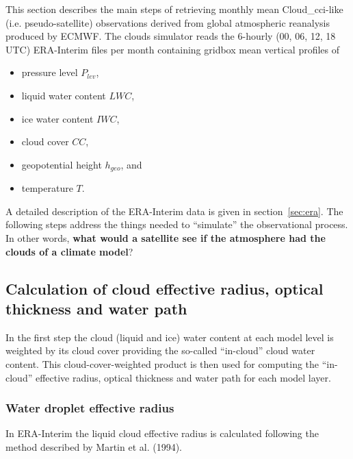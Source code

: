 

This section describes the main steps of retrieving monthly mean 
Cloud\_cci-like (i.e. pseudo-satellite) observations derived from 
global atmospheric reanalysis produced by ECMWF.
The clouds simulator reads the 6-hourly (00, 06, 12, 18 UTC) 
ERA-Interim files per month containing gridbox mean vertical profiles of
\begin{itemize}
    \item pressure level $P_{lev}$,
    \item liquid water content $LWC$,
    \item ice water content $IWC$,
    \item cloud cover $CC$,
    \item geopotential height $h_{geo}$, and
    \item temperature $T$.
\end{itemize}
A detailed description of the ERA-Interim data is given in section~\ref{sec:era}.
The following steps address the things needed to ``simulate'' the observational process.
In other words, \textbf{what would a satellite see if the atmosphere had the clouds
of a climate model}?

%

\subsection{Calculation of cloud effective radius, optical thickness and water path}
In the first step the cloud (liquid and ice) water content at each model level
is weighted by its cloud cover providing the so-called ``in-cloud'' cloud water content.
This cloud-cover-weighted product is then used for computing the ``in-cloud''
effective radius, optical thickness and water path for each model layer.

\subsubsection{Water droplet effective radius}
In ERA-Interim the liquid cloud effective radius is calculated following the method
described by Martin et al. (1994).

